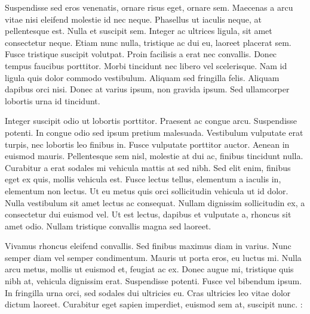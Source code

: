 Suspendisse sed eros venenatis, ornare risus eget, ornare sem. Maecenas a arcu vitae nisi eleifend molestie id nec neque. Phasellus ut iaculis neque, at pellentesque est. Nulla et suscipit sem. Integer ac ultrices ligula, sit amet consectetur neque. Etiam nunc nulla, tristique ac dui eu, laoreet placerat sem. Fusce tristique suscipit volutpat. Proin facilisis a erat nec convallis. Donec tempus faucibus porttitor. Morbi tincidunt nec libero vel scelerisque. Nam id ligula quis dolor commodo vestibulum. Aliquam sed fringilla felis. Aliquam dapibus orci nisi. Donec at varius ipsum, non gravida ipsum. Sed ullamcorper lobortis urna id tincidunt.

Integer suscipit odio ut lobortis porttitor. Praesent ac congue arcu. Suspendisse potenti. In congue odio sed ipsum pretium malesuada. Vestibulum vulputate erat turpis, nec lobortis leo finibus in. Fusce vulputate porttitor auctor. Aenean in euismod mauris. Pellentesque sem nisl, molestie at dui ac, finibus tincidunt nulla. Curabitur a erat sodales mi vehicula mattis at sed nibh. Sed elit enim, finibus eget ex quis, mollis vehicula est. Fusce lectus tellus, elementum a iaculis in, elementum non lectus. Ut eu metus quis orci sollicitudin vehicula ut id dolor. Nulla vestibulum sit amet lectus ac consequat. Nullam dignissim sollicitudin ex, a consectetur dui euismod vel. Ut est lectus, dapibus et vulputate a, rhoncus sit amet odio. Nullam tristique convallis magna sed laoreet.

Vivamus rhoncus eleifend convallis. Sed finibus maximus diam in varius. Nunc semper diam vel semper condimentum. Mauris ut porta eros, eu luctus mi. Nulla arcu metus, mollis ut euismod et, feugiat ac ex. Donec augue mi, tristique quis nibh at, vehicula dignissim erat. Suspendisse potenti. Fusce vel bibendum ipsum. In fringilla urna orci, sed sodales dui ultricies eu. Cras ultricies leo vitae dolor dictum laoreet. Curabitur eget sapien imperdiet, euismod sem at, suscipit nunc. :
